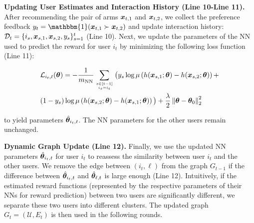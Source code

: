\noindent\textbf{Updating User Estimates and Interaction History (Line 10-Line 11).} 
After recommending the pair of arms $\boldsymbol{x}_{t,1}$ and $\boldsymbol{x}_{t,2}$, we collect the preference feedback $y_t = \mathbbm{1}(\bx_{t,1} \succ \bx_{t,2})$ and update interaction history: $\mathcal{D}_t = \{i_s, \boldsymbol{x}_{s,1}, \boldsymbol{x}_{s,2}, y_s\}_{s=1}^t$ (Line 10).
Next, we update the parameters of the NN used to predict the reward for user $i_t$ by minimizing the following loss function (Line 11):
\begin{small}
   \begin{align}
     &\mathcal{L}_{i_t,t}(\boldsymbol{\theta})= 
    - \frac{1}{m_{\text{NN}}} \sum_{s\in[t-1]\atop i_s = i_t}\big( y_s\log\mu\left( h(\boldsymbol{x}_{s,1};\boldsymbol{\theta}) - h(\boldsymbol{x}_{s,2};\boldsymbol{\theta}) \right) + \notag\\
    &(1-y_s)\log\mu\left(h(\boldsymbol{x}_{s,2};\boldsymbol{\theta}) - h(\boldsymbol{x}_{s,1};\boldsymbol{\theta})\right) \big) + \frac{\lambda}{2}\left\| \boldsymbol{\theta} - \boldsymbol{\theta}_0 \right\|_2^2
\end{align} 
\end{small}
to yield parameters $\hat{\boldsymbol{\theta}}_{i_t,t}$.
The NN parameters for the other users remain unchanged.

\noindent\textbf{Dynamic Graph Update (Line 12).} 
Finally, we use the updated NN parameters $\hat{\boldsymbol{\theta}}_{i_t,t}$ for user $i_t$ to reassess the similarity between user $i_t$ and the other users.
We remove the edge between $(i_t, \ell)$ from the graph $G_{t-1}$ if the difference between $\hat{\boldsymbol{\theta}}_{i_t,t}$ and $\hat{\boldsymbol{\theta}}_{\ell,t}$ is large enough (Line 12). Intuitively, if the estimated reward functions (represented by the respective parameters of their NNs for reward prediction) between two users are significantly different, we separate these two users into different clusters.
The updated graph $G_t = (\mathcal{U}, E_t)$ is then used in the following rounds.



